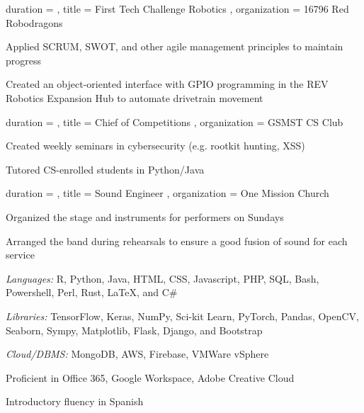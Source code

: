 \documentclass[sidebar-width=2.25in, primary=slate]{clean-resume}
\begin{document}
\begin{main}
    \begin{experience}
      {
        duration = {  },
        title = { First Tech Challenge Robotics },
        organization = { 16796 Red Robodragons }
      }
      \item Applied SCRUM, SWOT, and other agile management principles to maintain progress
      \item Created an object-oriented interface with GPIO programming in the REV Robotics Expansion Hub to automate drivetrain movement
    \end{experience}

    \begin{experience}
      {
        duration = {  },
        title = { Chief of Competitions },
        organization = { GSMST CS Club }
      }
      \item Created weekly seminars in cybersecurity (e.g. rootkit hunting, XSS)
      \item Tutored CS-enrolled students in Python/Java
    \end{experience}

    \begin{experience}
      {
        duration = {  },
        title = { Sound Engineer },
        organization = { One Mission Church }
      }
      \item Organized the stage and instruments for performers on Sundays
      \item Arranged the band during rehearsals to ensure a good fusion of sound for each service
    \end{experience}

    \begin{lst}
      \item \emph{Languages:} R, Python, Java, HTML, CSS, Javascript, PHP, SQL, Bash, Powershell, Perl, Rust, \LaTeX, and C\#
      \item \emph{Libraries:} TensorFlow, Keras, NumPy, Sci-kit Learn, PyTorch, Pandas, OpenCV, Seaborn, Sympy, Matplotlib, Flask, Django, and Bootstrap
      \item \emph{Cloud/DBMS:} MongoDB, AWS, Firebase, VMWare vSphere
      \item Proficient in Office 365, Google Workspace, Adobe Creative Cloud
      \item Introductory fluency in Spanish
    \end{lst}
  \end{main}
  \newpage
\end{document}
